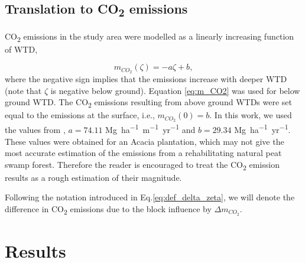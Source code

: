 \documentclass[bg, manuscript]{copernicus}
\begin{document}
\subsection{Translation to CO\textsubscript{2} emissions}

CO\textsubscript{2} emissions in the study area were modelled as a linearly increasing function of WTD,

\begin{equation} \label{eq:m_CO2}
    m_{CO_2}(\zeta) = -a  \zeta + b,
\end{equation}
where the negative sign implies that the emissions increase with deeper WTD (note that $\zeta$ is negative below ground).
Equation \eqref{eq:m_CO2} was used for below ground WTD.
The CO\textsubscript{2} emissions resulting from above ground WTDs were set equal to the emissions at the surface, i.e., $m_{CO_2}(0) = b$. 
In this work, we used the values from \cite{jauhiainenCarbonDioxideEmissions2012}, $a=74.11$ \unit{Mg ha^{-1} m^{-1} yr^{-1}} and  $b=29.34$ \unit{Mg ha^{-1} yr^{-1}}.
These values were obtained for an Acacia plantation, which may not give the most accurate estimation of the emissions from a rehabilitating natural peat swamp forest. 
Therefore the reader is encouraged to treat the CO\textsubscript{2} emission results as a rough estimation of their magnitude.

Following the notation introduced in Eq.\eqref{eq:def_delta_zeta}, we will denote the difference in CO\textsubscript{2} emissions due to the block influence by $\Delta m_{CO_2}$.



\section{Results}
\end{document}
